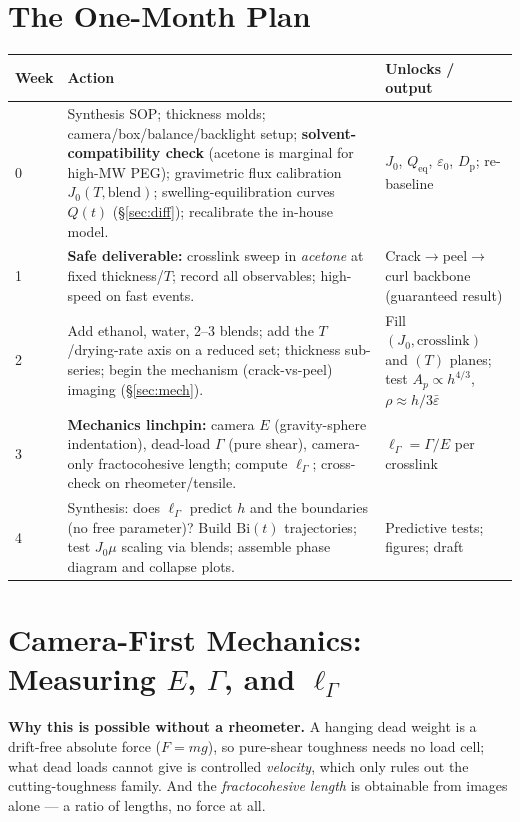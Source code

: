 \documentclass[12pt,letterpaper]{article}
\newcommand{\Gfrac}{\Gamma}
\newcommand{\Emod}{E}
\newcommand{\lG}{\ell_{\Gfrac}}          %
\newcommand{\Dp}{D_{\mathrm{p}}}
\newcommand{\Jflux}{J_0}
\newcommand{\Bi}{\mathrm{Bi}}
\begin{document}
\section{The One-Month Plan}
\begin{longtable}{@{}p{1.6cm}p{9.2cm}p{4.4cm}@{}}
\toprule
\textbf{Week} & \textbf{Action} & \textbf{Unlocks / output}\\
\midrule\endhead
0 & Synthesis SOP; thickness molds; camera/box/balance/backlight setup;
\textbf{solvent-compatibility check} (acetone is marginal for high-MW PEG);
gravimetric flux calibration $\Jflux(T,\text{blend})$; swelling-equilibration
curves $Q(t)$ (\S\ref{sec:diff}); recalibrate the in-house model. &
$\Jflux$, $Q_{\mathrm{eq}}$, $\varepsilon_0$, $\Dp$; re-baseline \\
1 & \textbf{Safe deliverable:} crosslink sweep in \emph{acetone} at fixed
thickness/$T$; record all observables; high-speed on fast events. &
Crack$\to$peel$\to$curl backbone (guaranteed result) \\
2 & Add ethanol, water, 2--3 blends; add the $T$/drying-rate axis on a reduced
set; thickness sub-series; begin the mechanism (crack-vs-peel) imaging
(\S\ref{sec:mech}). & Fill $(\Jflux,\text{crosslink})$ and $(T)$ planes; test
$A_p\!\propto\!h^{4/3}$, $\rho\!\approx\!h/3\bar\varepsilon$ \\
3 & \textbf{Mechanics linchpin:} camera $\Emod$ (gravity-sphere indentation),
dead-load $\Gfrac$ (pure shear), camera-only fractocohesive length; compute
$\lG$; cross-check on rheometer/tensile. & $\lG=\Gfrac/\Emod$ per crosslink \\
4 & Synthesis: does $\lG$ predict $h$ and the boundaries (no free parameter)?
Build $\Bi(t)$ trajectories; test $\Jflux\mu$ scaling via blends; assemble phase
diagram and collapse plots. & Predictive tests; figures; draft \\
\bottomrule
\end{longtable}

\section{Camera-First Mechanics: Measuring $\Emod$, $\Gfrac$, and $\lG$}
\begin{intuitionbox}
\textbf{Why this is possible without a rheometer.} A hanging dead weight is a
drift-free absolute force ($F=mg$), so pure-shear toughness needs no load cell;
what dead loads cannot give is controlled \emph{velocity}, which only rules out
the cutting-toughness family. And the \emph{fractocohesive length} is obtainable
from images alone --- a ratio of lengths, no force at all.
\end{intuitionbox}
\end{document}
